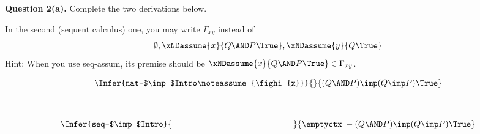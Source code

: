 \bigskip

  \vspace*{-1ex}

\clearpage



\textbf{Question 2(a).}
Complete the two derivations below.

In the second (sequent calculus) one, you may write
$\Gamma_{xy}$ instead of
\[
    \emptyset, \xNDassume{x}{Q \AND P \True},
    \xNDassume{y}{Q \True}
\]
Hint: When you use seq-assum, its premise should be
$\xNDassume{x}{Q \AND P \True} \in \Gamma_{xy}$.

\begin{minipage}{0.48\linewidth}
\vspace{40ex}
\[
\Infer{nat-$\imp$Intro\noteassume{\fighi{x}}}
   {
   }
   {(Q \AND P) \imp (Q \imp P) \True}
\]
\end{minipage}
~
\begin{minipage}{0.48\linewidth}
\vspace{40ex}
\[
\Infer{seq-$\imp$Intro}
   {
     \hspace*{33ex}  %
   }
   {\emptyctx |- (Q \AND P) \imp (Q \imp P) \True}
\]
\end{minipage}

\vfill

